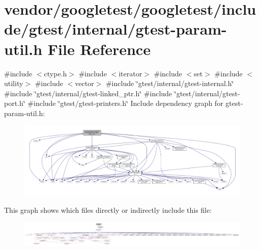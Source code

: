 \hypertarget{gtest-param-util_8h}{}\section{vendor/googletest/googletest/include/gtest/internal/gtest-\/param-\/util.h File Reference}
\label{gtest-param-util_8h}
{\ttfamily \#include $<$ctype.\+h$>$}\newline
{\ttfamily \#include $<$iterator$>$}\newline
{\ttfamily \#include $<$set$>$}\newline
{\ttfamily \#include $<$utility$>$}\newline
{\ttfamily \#include $<$vector$>$}\newline
{\ttfamily \#include \char`\"{}gtest/internal/gtest-\/internal.\+h\char`\"{}}\newline
{\ttfamily \#include \char`\"{}gtest/internal/gtest-\/linked\+\_\+ptr.\+h\char`\"{}}\newline
{\ttfamily \#include \char`\"{}gtest/internal/gtest-\/port.\+h\char`\"{}}\newline
{\ttfamily \#include \char`\"{}gtest/gtest-\/printers.\+h\char`\"{}}\newline
Include dependency graph for gtest-\/param-\/util.h\+:
\nopagebreak
\begin{figure}[H]
\begin{center}
\leavevmode
\includegraphics[width=350pt]{gtest-param-util_8h__incl}
\end{center}
\end{figure}
This graph shows which files directly or indirectly include this file\+:
\nopagebreak
\begin{figure}[H]
\begin{center}
\leavevmode
\includegraphics[width=350pt]{gtest-param-util_8h__dep__incl}
\end{center}
\end{figure}
